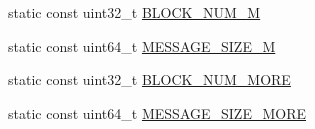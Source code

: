 \begin{DoxyCompactItemize}
\item 
static const uint32\-\_\-t \hyperlink{classapollo_1_1cyber_1_1transport_1_1ShmConf_af4dfe9ac9e8f07636e41dc44be427422}{B\-L\-O\-C\-K\-\_\-\-N\-U\-M\-\_\-M}
\item 
static const uint64\-\_\-t \hyperlink{classapollo_1_1cyber_1_1transport_1_1ShmConf_ae3cfd2f0c21df0c640c333ee7b2d565d}{M\-E\-S\-S\-A\-G\-E\-\_\-\-S\-I\-Z\-E\-\_\-M}
\item 
static const uint32\-\_\-t \hyperlink{classapollo_1_1cyber_1_1transport_1_1ShmConf_aab4ffc0f44779dc0e123906073407737}{B\-L\-O\-C\-K\-\_\-\-N\-U\-M\-\_\-\-M\-O\-R\-E}
\item 
static const uint64\-\_\-t \hyperlink{classapollo_1_1cyber_1_1transport_1_1ShmConf_abc60980337e73491ec089e824684349e}{M\-E\-S\-S\-A\-G\-E\-\_\-\-S\-I\-Z\-E\-\_\-\-M\-O\-R\-E}
\end{DoxyCompactItemize}


